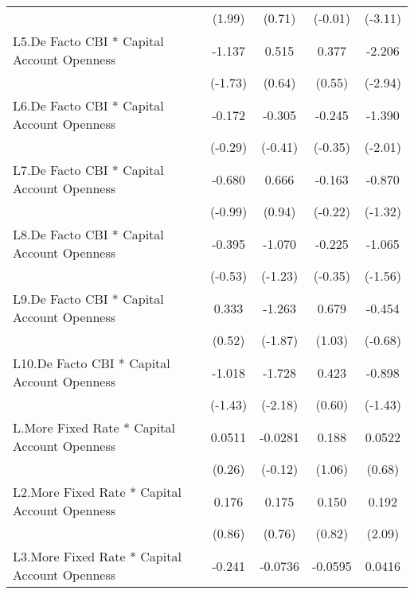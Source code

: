 {\begin{longtable}{l*{4}{c}}
                &   (1.99)         &   (0.71)         &  (-0.01)         &  (-3.11)         \\
[1em]
L5.De Facto CBI * Capital Account Openness&   -1.137         &    0.515         &    0.377         &   -2.206\sym{**} \\
                &  (-1.73)         &   (0.64)         &   (0.55)         &  (-2.94)         \\
[1em]
L6.De Facto CBI * Capital Account Openness&   -0.172         &   -0.305         &   -0.245         &   -1.390\sym{*}  \\
                &  (-0.29)         &  (-0.41)         &  (-0.35)         &  (-2.01)         \\
[1em]
L7.De Facto CBI * Capital Account Openness&   -0.680         &    0.666         &   -0.163         &   -0.870         \\
                &  (-0.99)         &   (0.94)         &  (-0.22)         &  (-1.32)         \\
[1em]
L8.De Facto CBI * Capital Account Openness&   -0.395         &   -1.070         &   -0.225         &   -1.065         \\
                &  (-0.53)         &  (-1.23)         &  (-0.35)         &  (-1.56)         \\
[1em]
L9.De Facto CBI * Capital Account Openness&    0.333         &   -1.263         &    0.679         &   -0.454         \\
                &   (0.52)         &  (-1.87)         &   (1.03)         &  (-0.68)         \\
[1em]
L10.De Facto CBI * Capital Account Openness&   -1.018         &   -1.728\sym{*}  &    0.423         &   -0.898         \\
                &  (-1.43)         &  (-2.18)         &   (0.60)         &  (-1.43)         \\
[1em]
L.More Fixed Rate * Capital Account Openness&   0.0511         &  -0.0281         &    0.188         &   0.0522         \\
                &   (0.26)         &  (-0.12)         &   (1.06)         &   (0.68)         \\
[1em]
L2.More Fixed Rate * Capital Account Openness&    0.176         &    0.175         &    0.150         &    0.192\sym{*}  \\
                &   (0.86)         &   (0.76)         &   (0.82)         &   (2.09)         \\
[1em]
L3.More Fixed Rate * Capital Account Openness&   -0.241         &  -0.0736         &  -0.0595         &   0.0416         \\

\end{longtable}}
